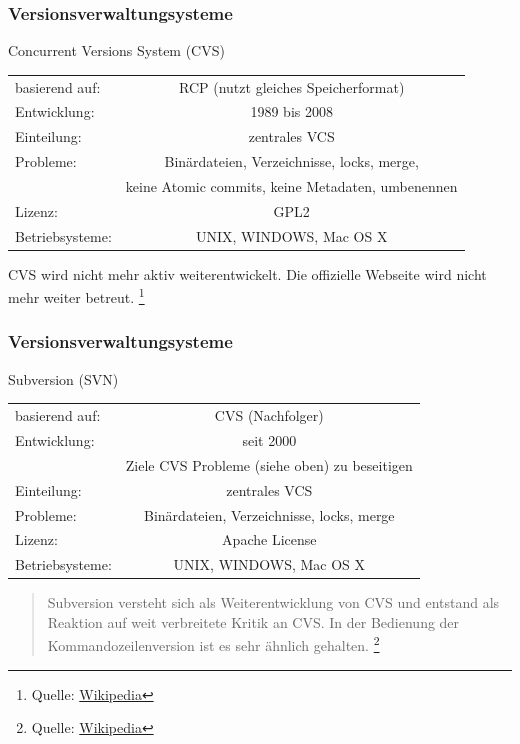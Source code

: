 \documentclass{beamer}
\begin{document}
\begin{frame}\frametitle{Versionsverwaltungsysteme} 
\begin{block}{Concurrent Versions System (CVS)}
	\begin{tabular}{l c}
basierend auf: & RCP (nutzt gleiches Speicherformat) \\ 
Entwicklung: & 1989 bis 2008  \\  
Einteilung: & zentrales VCS \\ 
Probleme: & Binärdateien, Verzeichnisse, locks, merge, \\
          & keine Atomic commits, keine Metadaten, umbenennen  \\
Lizenz: & GPL2 \\
Betriebsysteme: & UNIX, WINDOWS, Mac OS X \\
\end{tabular} 

\vspace*{0.3cm}
CVS wird nicht mehr aktiv weiterentwickelt. Die offizielle Webseite wird nicht mehr weiter betreut. \footnote{Quelle: \href{http://de.wikipedia.org/wiki/Concurrent_Versions_System}{Wikipedia}}
\end{block}
\end{frame}

\begin{frame}\frametitle{Versionsverwaltungsysteme} 
\begin{block}{Subversion (SVN)}
	\begin{tabular}{l c}
basierend auf: & CVS (Nachfolger) \\ 
Entwicklung: & seit 2000  \\  
 & Ziele CVS Probleme (siehe oben) zu beseitigen \\
Einteilung: & zentrales VCS \\ 
Probleme: & Binärdateien, Verzeichnisse, locks, merge \\
Lizenz: & Apache License \\
Betriebsysteme: & UNIX, WINDOWS, Mac OS X \\
\end{tabular} 
\begin{quote}
Subversion versteht sich als Weiterentwicklung von CVS und entstand als Reaktion auf weit verbreitete Kritik an CVS. In der Bedienung der Kommandozeilenversion ist es sehr ähnlich gehalten.  \footnote{Quelle: \href{http://de.wikipedia.org/wiki/Subversion_\%28Software\%29}{Wikipedia}}
\end{quote}
\end{block}
\end{frame}
\end{document}
